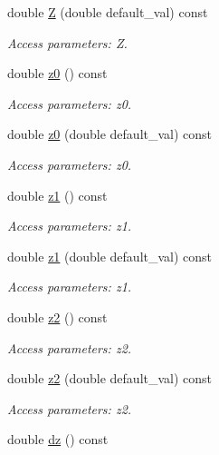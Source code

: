 \begin{DoxyCompactItemize}
double \hyperlink{struct_d_d4hep_1_1_x_m_l_1_1_dimension_aedb058f136406aaabac74eb3652731d6}{Z} (double default\+\_\+val) const
\begin{DoxyCompactList}\small\item\em Access parameters\+: Z. \end{DoxyCompactList}\item 
double \hyperlink{struct_d_d4hep_1_1_x_m_l_1_1_dimension_a54e4bc9f9049160f2466ad75a816a9c0}{z0} () const
\begin{DoxyCompactList}\small\item\em Access parameters\+: z0. \end{DoxyCompactList}\item 
double \hyperlink{struct_d_d4hep_1_1_x_m_l_1_1_dimension_a0112890602b0953d7f8b23d4520a3171}{z0} (double default\+\_\+val) const
\begin{DoxyCompactList}\small\item\em Access parameters\+: z0. \end{DoxyCompactList}\item 
double \hyperlink{struct_d_d4hep_1_1_x_m_l_1_1_dimension_ac591ad24cc4e29d2b6874457accc5d51}{z1} () const
\begin{DoxyCompactList}\small\item\em Access parameters\+: z1. \end{DoxyCompactList}\item 
double \hyperlink{struct_d_d4hep_1_1_x_m_l_1_1_dimension_a0d3c3f97eb69902451ce279d61c0f995}{z1} (double default\+\_\+val) const
\begin{DoxyCompactList}\small\item\em Access parameters\+: z1. \end{DoxyCompactList}\item 
double \hyperlink{struct_d_d4hep_1_1_x_m_l_1_1_dimension_ac994f62521bb130662e06520423217ba}{z2} () const
\begin{DoxyCompactList}\small\item\em Access parameters\+: z2. \end{DoxyCompactList}\item 
double \hyperlink{struct_d_d4hep_1_1_x_m_l_1_1_dimension_acc56534800575f9b095c98a32a1e8b0c}{z2} (double default\+\_\+val) const
\begin{DoxyCompactList}\small\item\em Access parameters\+: z2. \end{DoxyCompactList}\item 
double \hyperlink{struct_d_d4hep_1_1_x_m_l_1_1_dimension_a7467288e1413f603b01f82ec88600030}{dz} () const

\end{DoxyCompactItemize}
